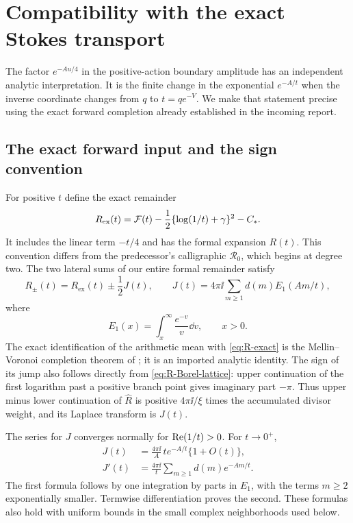 \section{Compatibility with the exact Stokes transport}
\label{sec:Stokes}

The factor $e^{-Au/4}$ in the positive-action boundary amplitude has an
independent analytic interpretation. It is the finite change in the
exponential $e^{-A/t}$ when the inverse coordinate changes from $q$ to
$t=qe^{-V}$. We make that statement precise using the exact forward
completion already established in the incoming report.

\subsection{The exact forward input and the sign convention}

For positive $t$ define the exact remainder
\begin{equation}\label{eq:R-exact}
 R_{\mathrm{ex}}(t)
 =\mathcal F(t)-\frac12\{\log(1/t)+\gamma\}^2-C_*.
\end{equation}
It includes the linear term $-t/4$ and has the formal expansion $R(t)$.
This convention differs from the predecessor's calligraphic
$\mathcal R_0$, which begins at degree two. The two lateral sums of our
entire formal remainder satisfy
\begin{equation}\label{eq:exact-lateral-input}
 R_\pm(t)=R_{\mathrm{ex}}(t)\pm\frac12J(t),\qquad
 J(t)=4\pi\ii\sum_{m\ge1}d(m)E_1(Am/t),
\end{equation}
where
\[
 E_1(x)=\int_x^\infty \frac{e^{-v}}v\dd v,\qquad x>0.
\]
The exact identification of the arithmetic mean with
\eqref{eq:R-exact} is the Mellin--Voronoi completion theorem of
\cite[Section 5]{incoming}; it is an imported analytic identity.
The sign of its jump also follows directly from
\eqref{eq:R-Borel-lattice}: upper continuation of the first logarithm
past a positive branch point gives imaginary part $-\pi$. Thus
upper minus lower continuation of $\widehat R$ is positive $4\pi\ii/\xi$
times the accumulated divisor weight, and its Laplace transform is
$J(t)$.

The series for $J$ converges normally for $\operatorname{Re}(1/t)>0$. For $t\to0^+$,
\begin{align}
 J(t)&=\frac{4\pi\ii}{A}\,t e^{-A/t}\{1+O(t)\},
       \label{eq:J-leading}\\
 J'(t)&=\frac{4\pi\ii}{t}\sum_{m\ge1}d(m)e^{-Am/t}.
       \label{eq:J-derivative}
\end{align}
The first formula follows by one integration by parts in $E_1$, with
the terms $m\ge2$ exponentially smaller. Termwise differentiation proves
the second. These formulas also hold with uniform bounds in the small
complex neighborhoods used below.

